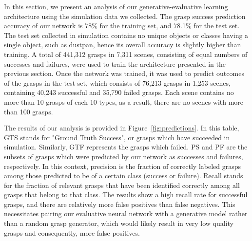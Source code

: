 In this section, we present an analysis of our generative-evaluative learning architecture using the simulation data we collected. The grasp success prediction accuracy of our network is 78\% for the training set, and 78.1\% for the test set. The test set collected in simulation contains no unique objects or classes having a single object, such as dustpan, hence its overall accuracy is slightly higher than training. A total of 441,312 grasps in 7,311 scenes, consisting of equal numbers of successes and failures, were used to train the architecture presented in the previous section. Once the network was trained, it was used to predict outcomes of the grasps in the test set, which consists of 76,213 grasps in 1,253 scenes, containing 40,243 successful and 35,790 failed grasps. Each scene contains no more than 10 grasps of each 10 types, as a result, there are no scenes with more than 100 grasps. 

The results of our analysis is provided in Figure~\ref{fig:predictions}. In this table, GTS stands for "Ground Truth Success", or grasps which have succeeded in simulation. Similarly, GTF represents the grasps which failed. PS and PF are the subsets of grasps which were predicted by our network as successes and failures, respectively. In this context, precision is the fraction of correctly labeled grasps among those predicted to be of a certain class (success or failure). Recall stands for the fraction of relevant grasps that have been identified correctly among all grasps that belong to that class. The results show a high recall rate for successful grasps, and there are relatively more false positives than false negatives. This necessitates pairing our evaluative neural network with a generative model rather than a random grasp generator, which would likely result in very low quality grasps and consequently, more false positives. 


